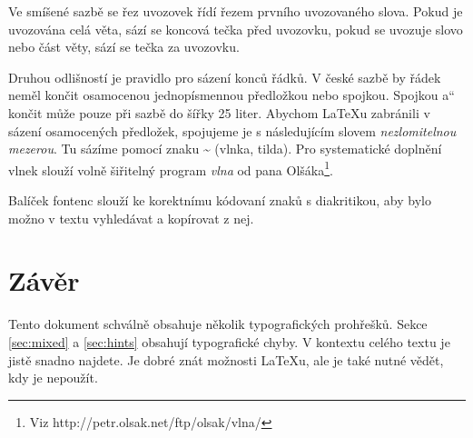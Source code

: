 \documentclass[czech,a4paper,10pt,twocolumn]{article}
\newcommand{\myquotes}[1]{\quotedblbase#1\textquotedblleft}
\begin{document}
Ve smíšené sazbě se řez uvozovek řídí řezem prvního uvozovaného slova. Pokud je uvozována celá věta, sází se koncová tečka před uvozovku, pokud se uvozuje slovo nebo část věty, sází se tečka za uvozovku.

Druhou odlišností je pravidlo pro sázení konců řádků. V české sazbě by řádek neměl končit osamocenou jednopísmennou předložkou nebo spojkou. Spojkou \myquotes{a} končit může pouze při sazbě do šířky 25 liter. Abychom {\LaTeX}u zabránili v sázení osamocených předložek, spojujeme je s následujícím slovem \emph{nezlomitelnou mezerou}. Tu sázíme pomocí znaku {\bfseries \textasciitilde} (vlnka, tilda). Pro systematické doplnění vlnek slouží volně šiřitelný program \emph{vlna} od pana Olšáka\footnote[2]{Viz {\ttfamily http://petr.olsak.net/ftp/olsak/vlna/}}.

Balíček {\ttfamily fontenc} slouží ke korektnímu kódovaní znaků s diakritikou, aby bylo možno v textu vyhledávat a kopírovat z nej.

\section{Závěr}
\label{sec:end}

Tento dokument schválně obsahuje několik typografických prohřešků. Sekce \ref{sec:mixed} a \ref{sec:hints} obsahují typografické chyby. V kontextu celého textu je jistě snadno najdete. Je dobré znát možnosti {\LaTeX}u, ale je také nutné vědět, kdy je nepoužít.
\end{document}
